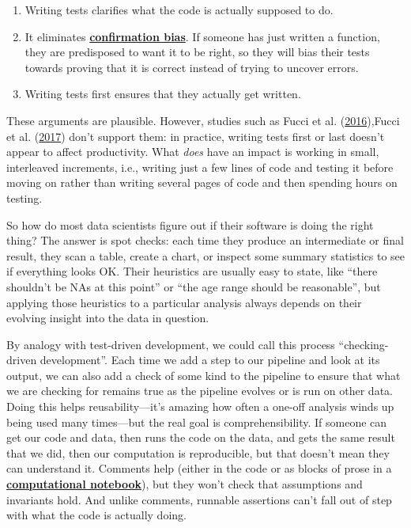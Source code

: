 \documentclass[
]{krantz}
\newcommand{\gref}[2]{\hyperlink{#2}{\textbf{#1}}}
\begin{document}
\begin{enumerate}
\def\labelenumi{\arabic{enumi}.}
\item
  Writing tests clarifies what the code is actually supposed to do.
\item
  It eliminates \gref{confirmation bias}{confirmation\_bias}.
  If someone has just written a function,
  they are predisposed to want it to be right,
  so they will bias their tests towards proving that it is correct
  instead of trying to uncover errors.
\item
  Writing tests first ensures that they actually get written.
\end{enumerate}

These arguments are plausible.
However,
studies such as Fucci et al. (\protect\hyperlink{ref-Fucc2016}{2016}),Fucci et al. (\protect\hyperlink{ref-Fucc2017}{2017}) don't support them:
in practice,
writing tests first or last doesn't appear to affect productivity.
What \emph{does} have an impact is working in small, interleaved increments,
i.e.,
writing just a few lines of code and testing it before moving on
rather than writing several pages of code and then spending hours on testing.

So how do most data scientists figure out if their software is doing the right thing?
The answer is spot checks:
each time they produce an intermediate or final result,
they scan a table, create a chart, or inspect some summary statistics
to see if everything looks OK.
Their heuristics are usually easy to state,
like ``there shouldn't be NAs at this point'' or ``the age range should be reasonable'',
but applying those heuristics to a particular analysis always depends on
their evolving insight into the data in question.

By analogy with test-driven development,
we could call this process ``checking-driven development''.
Each time we add a step to our pipeline and look at its output,
we can also add a check of some kind to the pipeline to ensure that
what we are checking for remains true as the pipeline evolves or is run on other data.
Doing this helps reusability---it's amazing how often a one-off analysis
winds up being used many times---but the real goal is comprehensibility.
If someone can get our code and data,
then runs the code on the data,
and gets the same result that we did,
then our computation is reproducible,
but that doesn't mean they can understand it.
Comments help
(either in the code or as blocks of prose in a \gref{computational notebook}{computational\_notebook}),
but they won't check that assumptions and invariants hold.
And unlike comments,
runnable assertions can't fall out of step with what the code is actually doing.
\end{document}
